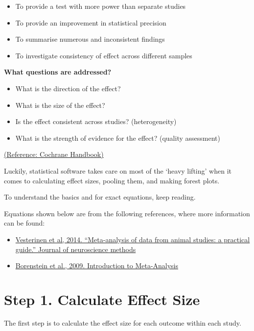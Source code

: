 \documentclass[
]{book}
\begin{document}
\begin{itemize}
\item
  To provide a test with more power than separate studies
\item
  To provide an improvement in statistical precision
\item
  To summarise numerous and inconsistent findings
\item
  To investigate consistency of effect across different samples
\end{itemize}

\textbf{What questions are addressed?}

\begin{itemize}
\item
  What is the direction of the effect?
\item
  What is the size of the effect?
\item
  Is the effect consistent across studies? (heterogeneity)
\item
  What is the strength of evidence for the effect? (quality assessment)
\end{itemize}

\href{http://www.cochrane-handbook.org/}{(Reference: Cochrane Handbook)}

Luckily, statistical software takes care on most of the `heavy lifting' when it comes to calculating effect sizes, pooling them, and making forest plots.

To understand the basics and for exact equations, keep reading.

Equations shown below are from the following references, where more information can be found:

\begin{itemize}
\item
  \href{https://doi.org/10.1016/j.jneumeth.2013.09.010}{Vesterinen et al, 2014. ``Meta-analysis of data from animal studies: a practical guide.'' Journal of neuroscience methods}
\item
  \href{https://doi.org/10.1002/9780470743386}{Borenstein et al., 2009. Introduction to Meta-Analysis}
\end{itemize}

\hypertarget{step-1.-calculate-effect-size}{%
\section{Step 1. Calculate Effect Size}\label{step-1.-calculate-effect-size}}

The first step is to calculate the effect size for each outcome within each study.
\end{document}
